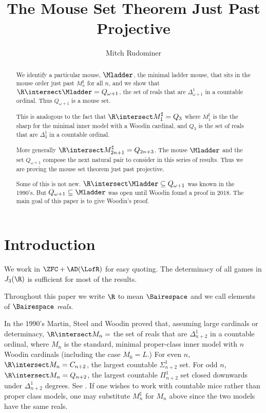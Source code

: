 \documentclass[oneside,12pt]{amsart}
\begin{document}
\title{The Mouse Set Theorem Just Past Projective}
\author{Mitch Rudominer}


\begin{abstract}
We identify a particular mouse, $\Mladder$, the minimal ladder mouse,
that sits in the mouse order just past $M_n^{\sharp}$ for all $n$,
 and we show that $\R\intersect \Mladder = Q_{\omega+1}$,
 the set of reals that are
$\Delta^1_{\omega+1}$ in a countable ordinal. Thus $Q_{\omega+1}$
is a mouse set.

This is analogous to the fact that $\R\intersect M^{\sharp}_1 = Q_3$ where $M^{\sharp}_1$ is the
the sharp for the minimal inner model with a Woodin cardinal, and $Q_3$ is the set of reals
that are $\Delta^1_3$ in a countable ordinal.

More generally $\R\intersect M^{\sharp}_{2n+1} = Q_{2n+3}$.
The mouse $\Mladder$ and the set $Q_{\omega+1}$  compose the next natural
pair to consider in this series of results. Thus we are proving the mouse
set theorem just past projective.

Some of this is not new. $\R\intersect \Mladder \subseteq Q_{\omega+1}$ was
known in the 1990's. But $Q_{\omega+1} \subseteq \Mladder$ was open
until Woodin found a proof in 2018. The main goal of this paper is to give
Woodin's proof.
\end{abstract}

\maketitle

\tableofcontents

\section{Introduction}
\label{section:intro}

We work in $\ZFC+\AD(\LofR)$ for easy quoting. The determinacy of all games
in $J_3(\R)$ is sufficient for most of the results.

Throughout this paper we write $\R$ to mean $\Bairespace$ and we call elements of $\Bairespace$ \emph{reals}.

In the 1990's Martin, Steel and Woodin proved that, assuming large cardinals or determinacy,
$\R\intersect M_n = $ the set of reals that are $\Delta^1_{n+2}$ in a countable ordinal,
where $M_n$ is the standard, minimal proper-class inner model with $n$ Woodin cardinals (including the case $M_0=L$.)
For even $n$, $\R\intersect M_n = C_{n+2}$, the largest countable $\Sigma^1_{n+2}$ set.
For odd $n$, $\R\intersect M_n = Q_{n+2}$, the largest countable $\Pi^1_{n+2}$
set closed downwards under $\Delta^1_{n+2}$ degrees. See \cite{Proj_WO_In_Mod}.
If one wishes to work with countable mice rather than proper class models, one may substitute
$M_n^{\sharp}$ for $M_n$ above since the two models have the same reals.
\end{document}
